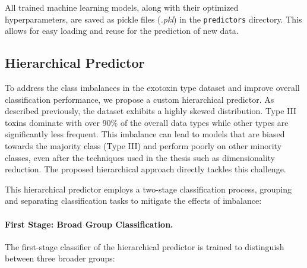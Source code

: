 \begin{table}[h]
	\centering
	\caption{Optimal hyperparameters for the ExoType classification models.}
	\label{tab:best_params}
\end{table}

All trained machine learning models, along with their optimized hyperparameters, are saved as pickle files (\textit{.pkl}) in the \texttt{predictors} directory.
This allows for easy loading and reuse for the prediction of new data.

\subsection{Hierarchical Predictor}
\label{subsubsection:hierarchical_model}

To address the class imbalances in the exotoxin type dataset and improve overall classification performance, we propose a custom hierarchical predictor.
As described previously, the dataset exhibits a highly skewed distribution.
Type III toxins dominate with over 90\% of the overall data types while other types are significantly less frequent.
This imbalance can lead to models that are biased towards the majority class (Type III) and perform poorly on other minority classes, even after the techniques used in the thesis such as dimensionality reduction.
The proposed hierarchical approach directly tackles this challenge.


This hierarchical predictor employs a two-stage classification process, grouping and separating classification tasks to mitigate the effects of imbalance:

\paragraph{First Stage: Broad Group Classification.} The first-stage classifier of the hierarchical predictor is trained to distinguish between three broader groups:

